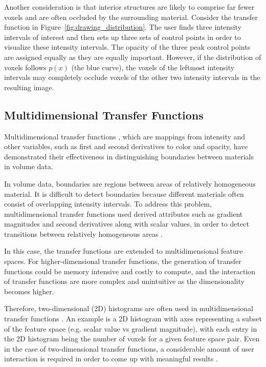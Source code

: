 \documentclass{egpubl}
\begin{document}
Another consideration is that interior structures are likely to comprise far fewer voxels and are often occluded by the surrounding material.
Consider the transfer function in Figure~\ref{fig:drawing_distribution}. The user finds three intensity intervals of interest and then sets up three sets of control points in order to visualize these intensity intervals. The opacity of the three peak control points are assigned equally as they are equally important.
However, if the distribution of voxels follows $ p(x) $ (the blue curve), the voxels of the leftmost intensity intervals may completely occlude voxels of the other two intensity intervals in the resulting image.


\subsection{Multidimensional Transfer Functions \label{Multidimensional_Transfer_Functions}}
Multidimensional transfer functions \cite{kniss_interactive_2001}, which are mappings from intensity and other variables, such as first and second derivatives to color and opacity, have demonstrated their effectiveness in distinguishing boundaries between materials in volume data.



In volume data, boundaries are regions between areas of relatively homogeneous material. It is difficult to detect boundaries because different materials often consist of overlapping intensity intervals. To address this problem, multidimensional transfer functions used derived attributes such as gradient magnitudes and second derivatives along with scalar values, in order to detect transitions between relatively homogeneous areas \cite{kindlmann_semi-automatic_1998} \cite{kindlmann_transfer_2002}.


In this case, the transfer functions are extended to multidimensional feature spaces.
For higher-dimensional transfer functions, the generation of transfer functions could be memory intensive and costly to compute, and the interaction of transfer functions are more complex and unintuitive as the dimensionality becomes higher. 

Therefore, two-dimensional (2D) histograms are often used in multidimensional transfer functions \cite{maciejewski_structuring_2009}. An example is a 2D histogram with axes representing a subset of the feature space (e.g. scalar value vs gradient magnitude), with each entry in the 2D histogram being the number of voxels for a given feature space pair.
Even in the case of two-dimensional transfer functions, a considerable amount of user interaction is required in order to come up with meaningful results \cite{arens_survey_2010}.
\end{document}
